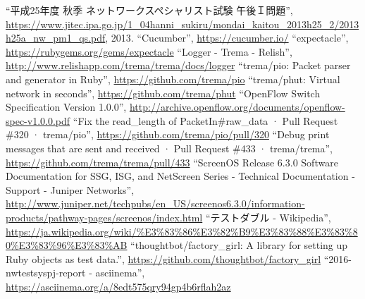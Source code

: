 \begin{thebibliography}{99}
         ``平成25年度 秋季 ネットワークスペシャリスト試験 午後Ｉ問題'',
         \url{https://www.jitec.ipa.go.jp/1_04hanni_sukiru/mondai_kaitou_2013h25_2/2013h25a_nw_pm1_qs.pdf}, 2013.
         ``Cucumber'',
         \url{https://cucumber.io/}
         ``expectacle'',
         \url{https://rubygems.org/gems/expectacle}
         ``Logger - Trema - Relish'',
         \url{http://www.relishapp.com/trema/trema/docs/logger}
         ``trema/pio: Packet parser and generator in Ruby'',
         \url{https://github.com/trema/pio}
         ``trema/phut: Virtual network in seconds'',
         \url{https://github.com/trema/phut}
         ``OpenFlow Switch Specification Version 1.0.0'',
         \url{http://archive.openflow.org/documents/openflow-spec-v1.0.0.pdf}
  ``Fix the read\_length of PacketIn\#raw\_data ·
         Pull Request \#320 · trema/pio'',
         \url{https://github.com/trema/pio/pull/320}
  ``Debug print messages that are sent and received
         · Pull Request \#433 · trema/trema'',
         \url{https://github.com/trema/trema/pull/433}
  ``ScreenOS Release 6.3.0 Software
         Documentation for SSG, ISG, and NetScreen Series - Technical
         Documentation - Support - Juniper Networks'',
         \url{http://www.juniper.net/techpubs/en_US/screenos6.3.0/information-products/pathway-pages/screenos/index.html}
  ``テストダブル - Wikipedia'',
         \url{https://ja.wikipedia.org/wiki/%E3%83%86%E3%82%B9%E3%83%88%E3%83%80%E3%83%96%E3%83%AB}
  ``thoughtbot/factory\_girl: A library for setting
         up Ruby objects as test data.'',
         \url{https://github.com/thoughtbot/factory_girl}
         ``2016-nwtestsyspj-report - asciinema'',
         \url{https://asciinema.org/a/8edt575qry94gp4b6rflah2az}
\end{thebibliography}


